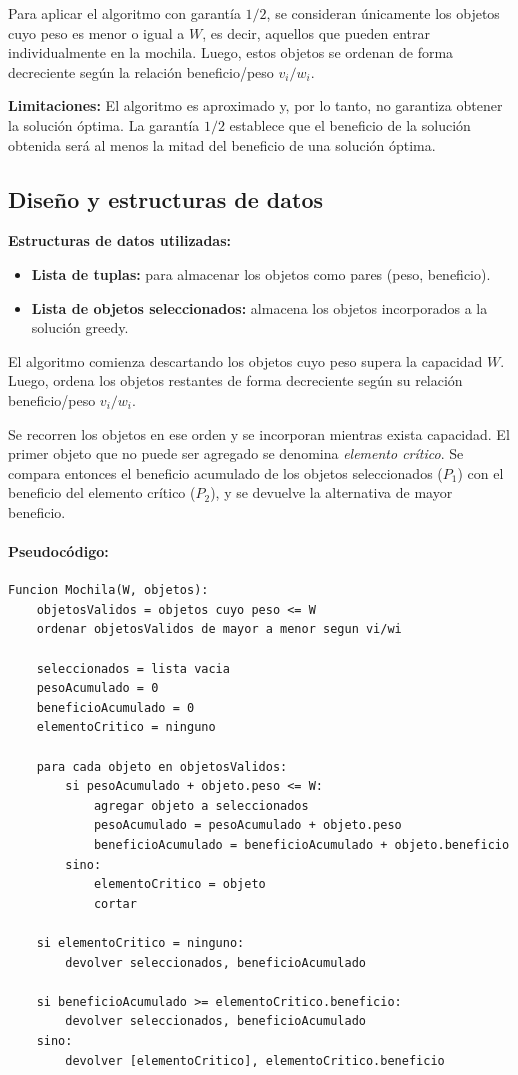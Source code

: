 \documentclass[11pt,a4paper]{article}
\begin{document}
Para aplicar el algoritmo con garantía $1/2$, se consideran únicamente los
objetos cuyo peso es menor o igual a $W$, es decir, aquellos que pueden entrar
individualmente en la mochila. Luego, estos objetos se ordenan de forma
decreciente según la relación beneficio/peso $v_i/w_i$.

\textbf{Limitaciones:} El algoritmo es aproximado y, por lo tanto, no garantiza
obtener la solución óptima. La garantía $1/2$ establece que el beneficio de la
solución obtenida será al menos la mitad del beneficio de una solución óptima.

\subsection{Diseño y estructuras de datos}

\textbf{Estructuras de datos utilizadas:}

\begin{itemize}
    \item \textbf{Lista de tuplas:} para almacenar los objetos como pares
    (peso, beneficio).

    \item \textbf{Lista de objetos seleccionados:} almacena los objetos
    incorporados a la solución greedy.
\end{itemize}

El algoritmo comienza descartando los objetos cuyo peso supera la capacidad
$W$. Luego, ordena los objetos restantes de forma decreciente según su relación
beneficio/peso $v_i/w_i$.

Se recorren los objetos en ese orden y se incorporan mientras exista capacidad.
El primer objeto que no puede ser agregado se denomina \textit{elemento crítico}.
Se compara entonces el beneficio acumulado de los objetos seleccionados
($P_1$) con el beneficio del elemento crítico ($P_2$), y se devuelve la
alternativa de mayor beneficio.

\paragraph{Pseudocódigo:}
\begin{lstlisting}
Funcion Mochila(W, objetos):
    objetosValidos = objetos cuyo peso <= W
    ordenar objetosValidos de mayor a menor segun vi/wi

    seleccionados = lista vacia
    pesoAcumulado = 0
    beneficioAcumulado = 0
    elementoCritico = ninguno

    para cada objeto en objetosValidos:
        si pesoAcumulado + objeto.peso <= W:
            agregar objeto a seleccionados
            pesoAcumulado = pesoAcumulado + objeto.peso
            beneficioAcumulado = beneficioAcumulado + objeto.beneficio
        sino:
            elementoCritico = objeto
            cortar

    si elementoCritico = ninguno:
        devolver seleccionados, beneficioAcumulado

    si beneficioAcumulado >= elementoCritico.beneficio:
        devolver seleccionados, beneficioAcumulado
    sino:
        devolver [elementoCritico], elementoCritico.beneficio
\end{lstlisting}
\end{document}

